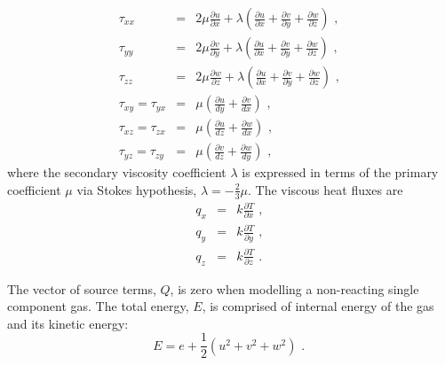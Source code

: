\begin{eqnarray}
 \tau_{xx} &=& 2 \mu \frac{\partial u }{\partial x} 
               + \lambda \left ( \frac{\partial u}{\partial x} 
                                 + \frac{\partial v}{\partial y} 
                                 + \frac{\partial w}{\partial z} \right ) \text{ , } \nonumber \\
 \tau_{yy} &=& 2 \mu \frac{\partial v }{\partial y} 
               + \lambda \left ( \frac{\partial u}{\partial x} 
                                 + \frac{\partial v}{\partial y} 
                                 + \frac{\partial w}{\partial z} \right ) \text{ , } \nonumber \\
 \tau_{zz} &=& 2 \mu \frac{\partial w }{\partial z} 
               + \lambda \left ( \frac{\partial u}{\partial x} 
                                 + \frac{\partial v}{\partial y} 
                                 + \frac{\partial w}{\partial z} \right ) \text{ , } \nonumber \\
 \tau_{xy} = \tau_{yx} &=& \mu \left ( \frac{\partial u}{dy} 
                                     + \frac{\partial v}{dx} \right ) \text{ , } \nonumber \\
 \tau_{xz} = \tau_{zx} &=& \mu \left ( \frac{\partial u}{dz} 
                                     + \frac{\partial w}{dx} \right ) \text{ , } \nonumber \\
 \tau_{yz} = \tau_{zy} &=& \mu \left ( \frac{\partial v}{dz} 
                                     + \frac{\partial w}{dy} \right ) \text{ , }
 \label{eq:taus_3D}
\end{eqnarray}
where the secondary viscosity coefficient $\lambda$ is expressed 
in terms of the primary coefficient $\mu$ via Stokes hypothesis, $\lambda = - \frac{2}{3} \mu$. 
The viscous heat fluxes are
\begin{eqnarray}
 q_{x} &=& k \frac{\partial T}{\partial x} \text{ , } \nonumber \\
 q_{y} &=& k \frac{\partial T}{\partial y} \text{ , } \nonumber \\
 q_{z} &=& k \frac{\partial T}{\partial z} \text{ . } \label{eq:qs}
\end{eqnarray}

The vector of source terms, $Q$, is zero when modelling a non-reacting single component gas.
The total energy, $E$, is comprised of internal energy of the gas and its kinetic
energy:
\begin{equation}
 E = e + \frac{1}{2}(u^2 + v^2 + w^2)\text{ . }
\end{equation}

